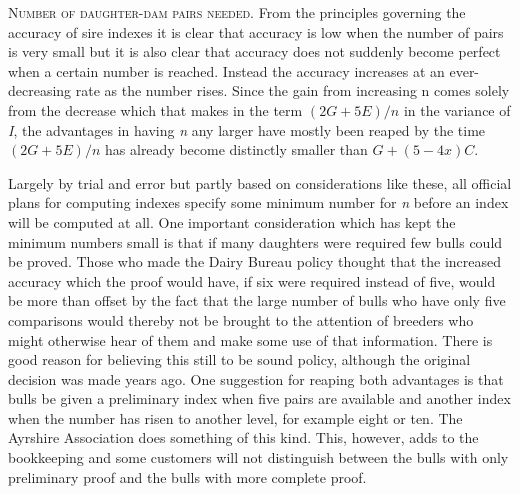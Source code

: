 \textsc{Number of daughter-dam pairs needed.} From the principles governing
the accuracy of sire indexes it is clear that accuracy is low when
the number of pairs is very small but it is also clear that accuracy does
not suddenly become perfect when a certain number is reached. Instead
the accuracy increases at an ever-decreasing rate as the number rises.
Since the gain from increasing n comes solely from the decrease which
that makes in the term $(2G + 5E)/n$ in the variance of \textit{I}, the
advantages in having \textit{n} any larger have mostly been reaped by the
time $(2G + 5E)/n$ has already become distinctly smaller than $G + (5-4x)C$.
\noclub

Largely by trial and error but partly based on considerations like
these, all official plans for computing indexes specify some minimum
number for \textit{n} before an index will be computed at all. One important
consideration which has kept the minimum numbers small is that if
many daughters were required few bulls could be proved. Those who
made the Dairy Bureau policy thought that the increased accuracy
which the proof would have, if six were required instead of five, would
be more than offset by the fact that the large number of bulls who have
only five comparisons would thereby not be brought to the attention of
breeders who might otherwise hear of them and make some use of that
information. There is good reason for believing this still to be sound
policy, although the original decision was made years ago. One suggestion
for reaping both advantages is that bulls be given a preliminary
index when five pairs are available and another index when the number
has risen to another level, for example eight or ten. The Ayrshire
Association does something of this kind. This, however, adds to the
bookkeeping and some customers will not distinguish between the bulls
with only preliminary proof and the bulls with more complete proof.

